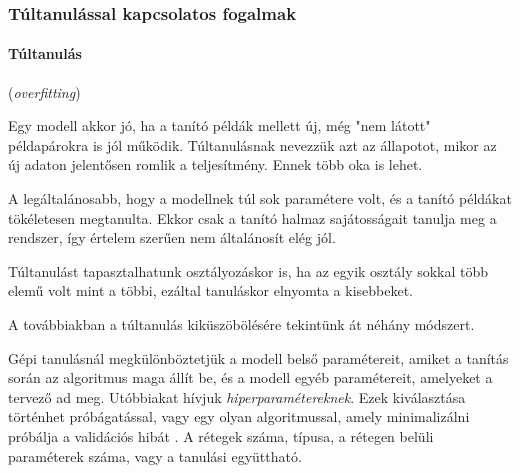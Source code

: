\subsubsection{Túltanulással kapcsolatos fogalmak}


\paragraph{Túltanulás} (\textit{overfitting})

%


Egy modell akkor jó, ha a tanító példák mellett új, még "nem látott"
példapárokra is jól működik. Túltanulásnak nevezzük
azt az állapotot, mikor az új adaton jelentősen romlik a teljesítmény.
Ennek több oka is lehet. 

A legáltalánosabb, hogy a modellnek túl sok paramétere volt, és a tanító példákat tökéletesen megtanulta. Ekkor csak a tanító halmaz sajátosságait tanulja meg a rendszer, így értelem szerűen nem általánosít elég jól.

Túltanulást tapasztalhatunk osztályozáskor is, ha az egyik osztály sokkal több elemű volt mint a többi, ezáltal tanuláskor elnyomta a kisebbeket.

A továbbiakban a túltanulás kiküszöbölésére tekintünk át néhány módszert.



Gépi tanulásnál megkülönböztetjük a modell belső paramétereit, amiket
a tanítás során az algoritmus maga állít be, és a modell egyéb paramétereit, amelyeket a tervező ad meg. Utóbbiakat hívjuk \textit{hiperparamétereknek}. Ezek kiválasztása történhet próbágatással, vagy egy olyan algoritmussal, amely minimalizálni próbálja a validációs hibát \cite{bergstra2013hyperopt}.  
A rétegek száma, típusa, a rétegen belüli paraméterek száma, vagy a tanulási együttható.



